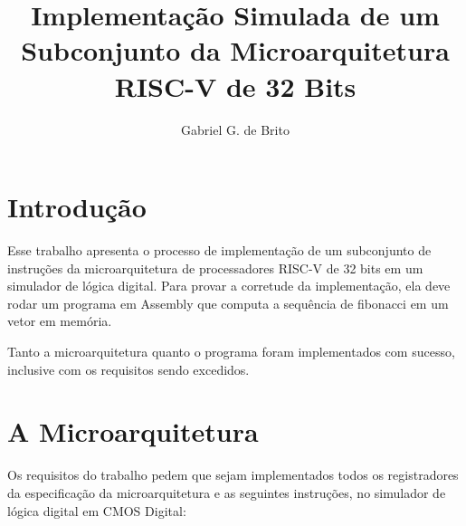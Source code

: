 \documentclass[twocolumn]{article}
\title{Implementação Simulada de um Subconjunto da Microarquitetura RISC-V de 32
  Bits}
\author{Gabriel G. de Brito}
\begin{document}
\maketitle

\section{Introdução}

Esse trabalho apresenta o processo de implementação de um subconjunto de
instruções da microarquitetura de processadores RISC-V de 32 bits em um
simulador de lógica digital. Para provar a corretude da implementação, ela deve
rodar um programa em Assembly que computa a sequência de fibonacci em um vetor
em memória.

Tanto a microarquitetura quanto o programa foram implementados com sucesso,
inclusive com os requisitos sendo excedidos.

\section{A Microarquitetura}

Os requisitos do trabalho pedem que sejam implementados todos os registradores
da especificação da microarquitetura e as seguintes instruções\cite{spec}, no
simulador de lógica digital em CMOS Digital\cite{digital}:
\end{document}
